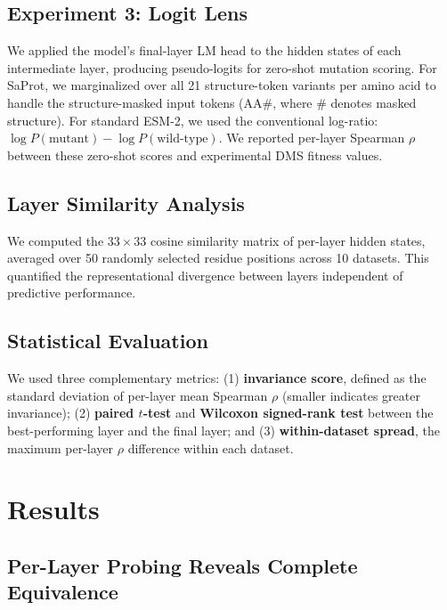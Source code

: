 \documentclass[11pt,a4paper]{article}
\begin{document}
\subsection{Experiment 3: Logit Lens}

We applied the model's final-layer LM head to the hidden states of each intermediate
layer, producing pseudo-logits for zero-shot mutation scoring. For SaProt, we
marginalized over all 21 structure-token variants per amino acid to handle the
structure-masked input tokens ($\text{AA}\#$, where $\#$ denotes masked structure).
For standard ESM-2, we used the conventional log-ratio: $\log P(\text{mutant}) - \log P(\text{wild-type})$.
We reported per-layer Spearman $\rho$ between these zero-shot scores and experimental
DMS fitness values.

\subsection{Layer Similarity Analysis}

We computed the $33 \times 33$ cosine similarity matrix of per-layer hidden states,
averaged over 50 randomly selected residue positions across 10 datasets. This
quantified the representational divergence between layers independent of
predictive performance.

\subsection{Statistical Evaluation}

We used three complementary metrics: (1) \textbf{invariance score}, defined as
the standard deviation of per-layer mean Spearman $\rho$ (smaller indicates greater invariance);
(2) \textbf{paired $t$-test} and \textbf{Wilcoxon signed-rank test} between the
best-performing layer and the final layer; and (3) \textbf{within-dataset spread},
the maximum per-layer $\rho$ difference within each dataset.

\section{Results}

\subsection{Per-Layer Probing Reveals Complete Equivalence}
\end{document}
